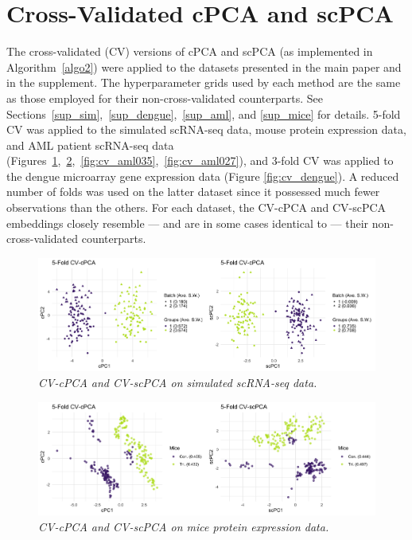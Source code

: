\documentclass{article}
\begin{document}
\newpage

\section{Cross-Validated cPCA and scPCA}\label{cv_algo_example}

The cross-validated (CV) versions of cPCA and scPCA (as implemented in Algorithm~\ref{algo2}) were applied to the datasets presented in the main paper and in the supplement. The hyperparameter grids used by each method are the same as those employed for their non-cross-validated counterparts. See Sections~\ref{sup_sim},~\ref{sup_dengue},~\ref{sup_aml}, and \ref{sup_mice} for details. 5-fold CV was applied to the simulated scRNA-seq data, mouse protein expression data, and AML patient scRNA-seq data (Figures~\ref{fig:cv_sim},~\ref{fig:cv_mice},~\ref{fig:cv_aml035},~\ref{fig:cv_aml027}), and 3-fold CV was applied to the dengue microarray gene expression data (Figure \ref{fig:cv_dengue}). A reduced number of folds was used on the latter dataset since it possessed much fewer observations than the others. For each dataset, the CV-cPCA and CV-scPCA embeddings closely resemble --- and are in some cases identical to --- their non-cross-validated counterparts.

\begin{figure}
    \centering
    \includegraphics[width = \textwidth]{figures/sim_cv_results.png}
    \caption{\em{CV-cPCA and CV-scPCA on simulated scRNA-seq data.}}
    \label{fig:cv_sim}
\end{figure}

\begin{figure}
    \centering
    \includegraphics[width = \textwidth]{figures/mice_cv_results.png}
    \caption{\em{CV-cPCA and CV-scPCA on mice protein expression data.}}
    \label{fig:cv_mice}
\end{figure}
\end{document}
